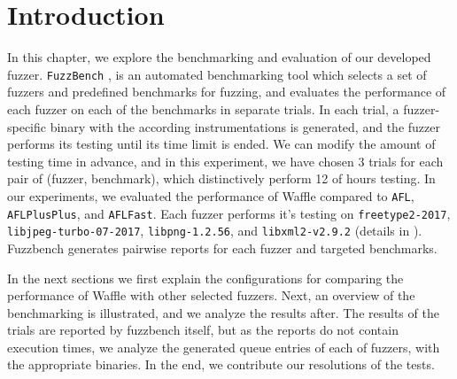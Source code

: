 \section{Introduction}
\label{sec:ch4-intro}


In this chapter, we explore the benchmarking and evaluation of our developed fuzzer. \texttt{FuzzBench} \cite{metzman2020fuzzbench}, is an automated benchmarking tool which selects a set of fuzzers and predefined benchmarks for fuzzing, and evaluates the performance of each fuzzer on each of the benchmarks in separate trials. In each trial, a fuzzer-specific binary with the according instrumentations is generated, and the fuzzer performs its testing until its time limit is ended. We can modify the amount of testing time in advance, and in this experiment, we have chosen 3 trials for each pair of (fuzzer, benchmark), which distinctively perform 12 of hours testing. In our experiments, we evaluated the performance of Waffle compared to \texttt{AFL}, \texttt{AFLPlusPlus}, and \texttt{AFLFast}. Each fuzzer performs it's testing on \texttt{freetype2-2017}, \texttt{libjpeg-turbo-07-2017}, \texttt{libpng-1.2.56}, and \texttt{libxml2-v2.9.2} (details in \cite{fuzzbench_benchmarks}). Fuzzbench generates pairwise reports for each fuzzer and targeted benchmarks.

In the next sections we first explain the configurations for comparing the performance of Waffle with other selected fuzzers. Next, an overview of the benchmarking is illustrated, and we analyze the results after. The results of the trials are reported by fuzzbench itself, but as the reports do not contain execution times, we analyze the generated queue entries of each of fuzzers, with the appropriate binaries. In the end, we contribute our resolutions of the tests.